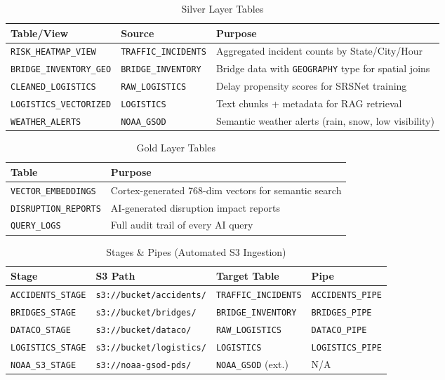 \documentclass[14.5pt,letterpaper]{article}
\begin{document}
\begin{table}[H]
\centering
\caption{Silver Layer Tables}
\small
\begin{tabular}{@{}lll@{}}
\toprule
\textbf{Table/View} & \textbf{Source} & \textbf{Purpose} \\
\midrule
\texttt{RISK\_HEATMAP\_VIEW} & \texttt{TRAFFIC\_INCIDENTS} & Aggregated incident counts by State/City/Hour \\
\texttt{BRIDGE\_INVENTORY\_GEO} & \texttt{BRIDGE\_INVENTORY} & Bridge data with \texttt{GEOGRAPHY} type for spatial joins \\
\texttt{CLEANED\_LOGISTICS} & \texttt{RAW\_LOGISTICS} & Delay propensity scores for SRSNet training \\
\texttt{LOGISTICS\_VECTORIZED} & \texttt{LOGISTICS} & Text chunks + metadata for RAG retrieval \\
\texttt{WEATHER\_ALERTS} & \texttt{NOAA\_GSOD} & Semantic weather alerts (rain, snow, low visibility) \\
\bottomrule
\end{tabular}
\end{table}

\begin{table}[H]
\centering
\caption{Gold Layer Tables}
\begin{tabular}{@{}ll@{}}
\toprule
\textbf{Table} & \textbf{Purpose} \\
\midrule
\texttt{VECTOR\_EMBEDDINGS} & Cortex-generated 768-dim vectors for semantic search \\
\texttt{DISRUPTION\_REPORTS} & AI-generated disruption impact reports \\
\texttt{QUERY\_LOGS} & Full audit trail of every AI query \\
\bottomrule
\end{tabular}
\end{table}

\begin{table}[H]
\centering
\caption{Stages \& Pipes (Automated S3 Ingestion)}
\small
\begin{tabular}{@{}llll@{}}
\toprule
\textbf{Stage} & \textbf{S3 Path} & \textbf{Target Table} & \textbf{Pipe} \\
\midrule
\texttt{ACCIDENTS\_STAGE} & \texttt{s3://bucket/accidents/} & \texttt{TRAFFIC\_INCIDENTS} & \texttt{ACCIDENTS\_PIPE} \\
\texttt{BRIDGES\_STAGE} & \texttt{s3://bucket/bridges/} & \texttt{BRIDGE\_INVENTORY} & \texttt{BRIDGES\_PIPE} \\
\texttt{DATACO\_STAGE} & \texttt{s3://bucket/dataco/} & \texttt{RAW\_LOGISTICS} & \texttt{DATACO\_PIPE} \\
\texttt{LOGISTICS\_STAGE} & \texttt{s3://bucket/logistics/} & \texttt{LOGISTICS} & \texttt{LOGISTICS\_PIPE} \\
\texttt{NOAA\_S3\_STAGE} & \texttt{s3://noaa-gsod-pds/} & \texttt{NOAA\_GSOD} (ext.) & N/A \\
\bottomrule
\end{tabular}
\end{table}
\end{document}
